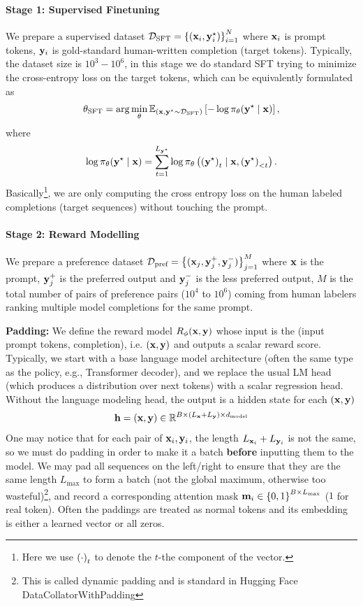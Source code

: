 \documentclass[11pt]{article}  %
\begin{document}
\paragraph{Stage 1: Supervised Finetuning} We prepare a supervised dataset $\mathcal{D}_{\text{SFT}} = \left\{ (\mathbf{x}_i, \mathbf{y}_i^\star) \right\}_{i=1}^N$ where $\mathbf{x}_i$ is prompt tokens, $\mathbf{y}_i$ is gold-standard human-written completion (target tokens). 
Typically, the dataset size is $10^3 - 10^6$, in this stage we do standard SFT trying to minimize the cross-entropy loss on the target tokens, which can be equivalently formulated as 
\begin{align*}
  \theta_{\text{SFT}} = \arg\min_{\theta} \mathbb{E}_{(\mathbf{x}, \mathbf{y}^\star \sim \mathcal{D}_{\text{SFT}})}\left[- \log \pi_{\theta}(\mathbf{y}^\star \mid \mathbf{x})\right],
\end{align*}
where 
\begin{align*}
  \log \pi_{\theta}(\mathbf{y}^\star \mid \mathbf{x}) = \sum_{t=1}^{L_{\mathbf{y}^\star}}\log \pi_{\theta}\left( \left( \mathbf{y}^\star \right)_t \mid \mathbf{x},  \left( \mathbf{y}^\star \right)_{<t} \right).
\end{align*}
Basically\footnote{Here we use $\left( \cdot \right)_t$ to denote the $t$-the component of the vector.}, we are only computing the cross entropy loss on the human labeled completions (target sequences) without touching the prompt.


\paragraph{Stage 2: Reward Modelling} We prepare a preference dataset $\mathcal{D}_{\text{pref}} = \left\{ (\mathbf{x}_j, \mathbf{y}_j^+, \mathbf{y}_j^-) \right\}_{j=1}^M$ where $\mathbf{x}$ is the prompt, $\mathbf{y}_j^+$ is the preferred output and $\mathbf{y}_j^-$ is the less preferred output, $M$ is the total number of pairs of preference pairs ($10^4$ to $10^6$) coming from human labelers ranking multiple model completions for the same prompt.


\textbf{Padding:} We define the reward model $R_{\phi}(\mathbf{x}, \mathbf{y})$ whose input is the (input prompt tokens, completion), i.e. $(\mathbf{x}, \mathbf{y})$ and outputs a scalar reward score.
Typically, we start with a base language model architecture (often the same type as the policy, e.g., Transformer decoder), and we replace the usual LM head (which produces a distribution over next tokens) with a scalar regression head. 
Without the language modeling head, the output is a hidden state for each $(\mathbf{x}, \mathbf{y})$
\begin{align*}
  \mathbf{h} = \left( \mathbf{x}, \mathbf{y} \right) \in \mathbb{R}^{B \times (L_{\mathbf{x}} + L_{\mathbf{y}}) \times d_{\text{model}}}
\end{align*}
One may notice that for each pair of $\mathbf{x}_i, \mathbf{y}_i$, the length $L_{\mathbf{x}_i} + L_{\mathbf{y}_i}$ is not the same, so we must do padding in order to make it a batch \textbf{before} inputting them to the model.
We may pad all sequences on the left/right to ensure that they are the same length $L_{\max}$ to form a batch (not the global maximum, otherwise too wasteful)\footnote{This is called dynamic padding and is standard in Hugging Face DataCollatorWithPadding}, and record a corresponding attention mask $\mathbf{m}_i \in \left\{ 0, 1 \right\}^{B \times L_{\max}}$ ($1$ for real token).
Often the paddings are treated as normal tokens and its embedding is either a learned vector or all zeros. 
\end{document}

